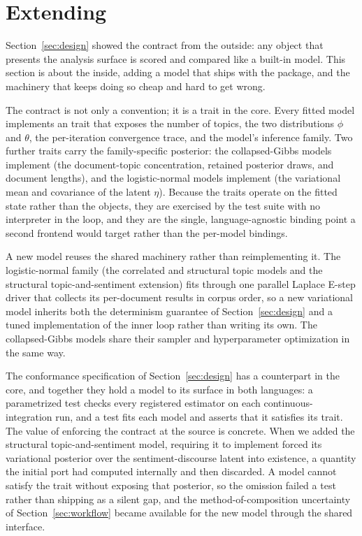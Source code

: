 \documentclass[article]{jss}
\begin{document}
\section[Extending topica]{Extending }\label{sec:extending}

Section~\ref{sec:design} showed the contract from the outside: any object that
presents the analysis surface is scored and compared like a built-in model. This
section is about the inside, adding a model that ships with the package, and the
machinery that keeps doing so cheap and hard to get wrong.

The contract is not only a  convention; it is a trait in the
 core. Every fitted model implements an  trait
that exposes the number of topics, the two distributions $\phi$ and $\theta$, the
per-iteration convergence trace, and the model's inference family. Two further
traits carry the family-specific posterior: the collapsed-Gibbs models implement
 (the document-topic concentration, retained posterior
draws, and document lengths), and the logistic-normal models implement
 (the variational mean and covariance of the latent
$\eta$). Because the traits operate on the fitted state rather than the
 objects, they are exercised by the  test suite
with no interpreter in the loop, and they are the single, language-agnostic
binding point a second frontend would target rather than the per-model
 bindings.

A new model reuses the shared machinery rather than reimplementing it. The
logistic-normal family (the correlated and structural topic models and the
structural topic-and-sentiment extension) fits through one parallel Laplace
E-step driver that collects its per-document results in corpus order, so a new
variational model inherits both the determinism guarantee of
Section~\ref{sec:design} and a tuned implementation of the inner loop rather than
writing its own. The collapsed-Gibbs models share their sampler and
hyperparameter optimization in the same way.

The conformance specification of Section~\ref{sec:design} has a counterpart in the
core, and together they hold a model to its surface in both languages: a
parametrized  test checks every registered estimator on each
continuous-integration run, and a  test fits each model and asserts
that it satisfies its trait. The value of enforcing the contract at the source is
concrete. When we added the structural topic-and-sentiment model, requiring it to
implement  forced its variational posterior over the
sentiment-discourse latent into existence, a quantity the initial port had
computed internally and then discarded. A model cannot satisfy the trait without
exposing that posterior, so the omission failed a test rather than shipping as a
silent gap, and the method-of-composition uncertainty of
Section~\ref{sec:workflow} became available for the new model through the shared
interface.
\end{document}
